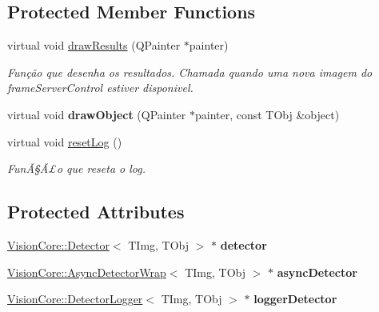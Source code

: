 \subsection*{Protected Member Functions}
\begin{DoxyCompactItemize}
\item 
\hypertarget{class_detector_control_aa429fbdf6a7f790d22dd1f23616f41de}{}virtual void \hyperlink{class_detector_control_aa429fbdf6a7f790d22dd1f23616f41de}{draw\+Results} (Q\+Painter $\ast$painter)\label{class_detector_control_aa429fbdf6a7f790d22dd1f23616f41de}

\begin{DoxyCompactList}\small\item\em Função que desenha os resultados. Chamada quando uma nova imagem do frame\+Server\+Control estiver disponivel. \end{DoxyCompactList}\item 
\hypertarget{class_detector_control_ac36825442b03cbca4d3d57a89eb398e2}{}virtual void {\bfseries draw\+Object} (Q\+Painter $\ast$painter, const T\+Obj \&object)\label{class_detector_control_ac36825442b03cbca4d3d57a89eb398e2}

\item 
\hypertarget{class_detector_control_a0f269bca8139be827d8f673bed676f60}{}virtual void \hyperlink{class_detector_control_a0f269bca8139be827d8f673bed676f60}{reset\+Log} ()\label{class_detector_control_a0f269bca8139be827d8f673bed676f60}

\begin{DoxyCompactList}\small\item\em FunÃ§Ã£o que reseta o log. \end{DoxyCompactList}\end{DoxyCompactItemize}
\subsection*{Protected Attributes}
\begin{DoxyCompactItemize}
\item 
\hypertarget{class_detector_control_acb792f10e755c53f2d9a3da84a5793ea}{}\hyperlink{class_vision_core_1_1_interfaces_1_1_detector}{Vision\+Core\+::\+Detector}$<$ T\+Img, T\+Obj $>$ $\ast$ {\bfseries detector}\label{class_detector_control_acb792f10e755c53f2d9a3da84a5793ea}

\item 
\hypertarget{class_detector_control_a86143917479ecb80b7af4e0503f06d65}{}\hyperlink{class_vision_core_1_1_async_1_1_async_detector_wrap}{Vision\+Core\+::\+Async\+Detector\+Wrap}$<$ T\+Img, T\+Obj $>$ $\ast$ {\bfseries async\+Detector}\label{class_detector_control_a86143917479ecb80b7af4e0503f06d65}

\item 
\hypertarget{class_detector_control_a50385c631dcd9b492af876c26aca9fce}{}\hyperlink{class_vision_core_1_1_abstractions_1_1_detector_logger}{Vision\+Core\+::\+Detector\+Logger}$<$ T\+Img, T\+Obj $>$ $\ast$ {\bfseries logger\+Detector}\label{class_detector_control_a50385c631dcd9b492af876c26aca9fce}

\end{DoxyCompactItemize}


